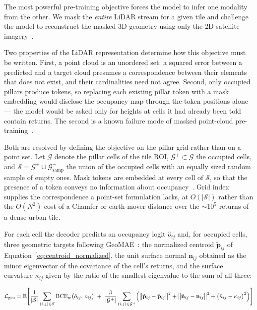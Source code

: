 \documentclass{book}
\begin{document}
The most powerful pre-training objective forces the model to
infer one modality from the other.  We mask the \emph{entire}
LiDAR stream for a given tile and challenge the model to
reconstruct the masked 3D geometry using only the 2D satellite
imagery~\cite{liu2023geomae}.

Two properties of the LiDAR representation determine how this
objective must be written.  First, a point cloud is an unordered
set: a squared error between a predicted and a target cloud
presumes a correspondence between their elements that does not
exist, and their cardinalities need not agree.  Second, only
occupied pillars produce tokens, so replacing each existing pillar
token with a mask embedding would disclose the occupancy map
through the token positions alone --- the model would be asked only
for heights at cells it had already been told contain returns.  The
second is a known failure mode of masked point-cloud
pre-training~\cite{hess2023masked}.

Both are resolved by defining the objective on the pillar grid
rather than on a point set.  Let $\mathcal{G}$ denote the pillar
cells of the tile ROI, $\mathcal{G}^{+} \subset \mathcal{G}$ the
occupied cells, and $\mathcal{S} = \mathcal{G}^{+} \cup
\mathcal{G}^{-}_{\text{samp}}$ the union of the occupied cells with
an equally sized random sample of empty ones.  Mask tokens are
embedded at every cell of $\mathcal{S}$, so that the presence of a
token conveys no information about
occupancy~\cite{hess2023masked}.  Grid index supplies the
correspondence a point-set formulation lacks, at
$O(|\mathcal{S}|)$ rather than the $O(N^2)$ cost of a Chamfer or
earth-mover distance over the $\sim 10^5$ returns of a dense urban
tile.

For each cell the decoder predicts an occupancy logit
$\hat{o}_{ij}$ and, for occupied cells, three geometric targets
following GeoMAE~\cite{liu2023geomae}: the normalized centroid
$\tilde{\mathbf{p}}_{ij}$ of
Equation~\eqref{eq:centroid_normalized}, the unit surface normal
$\mathbf{n}_{ij}$ obtained as the minor eigenvector of the
covariance of the cell's returns, and the surface curvature
$\kappa_{ij}$ given by the ratio of the smallest eigenvalue to the
sum of all three:

\begin{equation}
  \mathcal{L}_{\text{geo}} =
    \mathbb{E}\Biggl[
      \frac{1}{|\mathcal{S}|}\sum_{(i,j) \in \mathcal{S}}
        \mathrm{BCE}_{w}\bigl(\hat{o}_{ij},\, o_{ij}\bigr)
      \;+\;
      \frac{\beta}{|\mathcal{G}^{+}|}
        \sum_{(i,j) \in \mathcal{G}^{+}}
        \Bigl(
          \bigl\| \hat{\mathbf{p}}_{ij}
            - \tilde{\mathbf{p}}_{ij} \bigr\|^2
          + \bigl\| \hat{\mathbf{n}}_{ij}
            - \mathbf{n}_{ij} \bigr\|^2
          + \bigl( \hat{\kappa}_{ij}
            - \kappa_{ij} \bigr)^2
        \Bigr)
    \Biggr]
  \label{eq:cross_modal_loss}
\end{equation}
\end{document}
